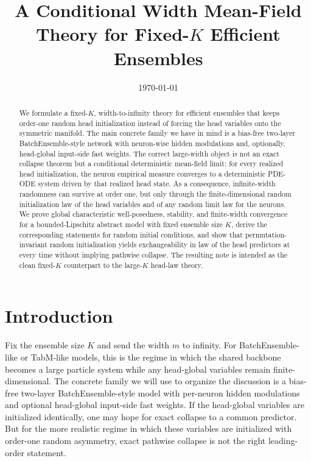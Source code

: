 \documentclass[11pt]{article}
\title{A Conditional Width Mean-Field Theory for \texorpdfstring{Fixed-$K$}{Fixed-K} Efficient Ensembles}
\author{}
\date{\today}
\theoremstyle{definition}
\begin{document}
\maketitle

\begin{abstract}
We formulate a fixed-$K$, width-to-infinity theory for efficient ensembles that keeps order-one random head initialization instead of forcing the head variables onto the symmetric manifold. The main concrete family we have in mind is a bias-free two-layer BatchEnsemble-style network with neuron-wise hidden modulations and, optionally, head-global input-side fast weights. The correct large-width object is not an exact collapse theorem but a conditional deterministic mean-field limit: for every realized head initialization, the neuron empirical measure converges to a deterministic PDE-ODE system driven by that realized head state. As a consequence, infinite-width randomness can survive at order one, but only through the finite-dimensional random initialization law of the head variables and of any random limit law for the neurons. We prove global characteristic well-posedness, stability, and finite-width convergence for a bounded-Lipschitz abstract model with fixed ensemble size $K$, derive the corresponding statements for random initial conditions, and show that permutation-invariant random initialization yields exchangeability in law of the head predictors at every time without implying pathwise collapse. The resulting note is intended as the clean fixed-$K$ counterpart to the large-$K$ head-law theory.
\end{abstract}

\section{Introduction}

Fix the ensemble size $K$ and send the width $m$ to infinity. For BatchEnsemble-like or TabM-like models, this is the regime in which the shared backbone becomes a large particle system while any head-global variables remain finite-dimensional. The concrete family we will use to organize the discussion is a bias-free two-layer BatchEnsemble-style model with per-neuron hidden modulations and optional head-global input-side fast weights. If the head-global variables are initialized identically, one may hope for exact collapse to a common predictor. But for the more realistic regime in which these variables are initialized with order-one random asymmetry, exact pathwise collapse is not the right leading-order statement.
\end{document}
